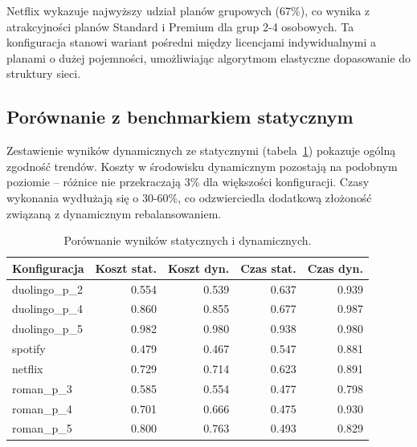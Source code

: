 Netflix wykazuje najwyższy udział planów grupowych (67\%), co wynika z atrakcyjności planów Standard i Premium dla grup 2-4 osobowych. Ta konfiguracja stanowi wariant pośredni między licencjami indywidualnymi a planami o dużej pojemności, umożliwiając algorytmom elastyczne dopasowanie do struktury sieci.

\subsection{Porównanie z benchmarkiem statycznym}

Zestawienie wyników dynamicznych ze statycznymi (tabela~\ref{tab:ext-static-dynamic-comparison}) pokazuje ogólną zgodność trendów. Koszty w środowisku dynamicznym pozostają na podobnym poziomie -- różnice nie przekraczają 3\% dla większości konfiguracji. Czasy wykonania wydłużają się o 30-60\%, co odzwierciedla dodatkową złożoność związaną z dynamicznym rebalansowaniem.

\begin{table}[H]
  \centering
  \caption{Porównanie wyników statycznych i dynamicznych.}
  \label{tab:ext-static-dynamic-comparison}
  \begin{tabular}{lrrrr}
    \toprule
    \textbf{Konfiguracja} & \textbf{Koszt stat.} & \textbf{Koszt dyn.} & \textbf{Czas stat.} & \textbf{Czas dyn.} \\
    \midrule
    duolingo\_p\_2        & 0.554                & 0.539               & 0.637               & 0.939              \\
    duolingo\_p\_4        & 0.860                & 0.855               & 0.677               & 0.987              \\
    duolingo\_p\_5        & 0.982                & 0.980               & 0.938               & 0.980              \\
    spotify               & 0.479                & 0.467               & 0.547               & 0.881              \\
    netflix               & 0.729                & 0.714               & 0.623               & 0.891              \\
    roman\_p\_3           & 0.585                & 0.554               & 0.477               & 0.798              \\
    roman\_p\_4           & 0.701                & 0.666               & 0.475               & 0.930              \\
    roman\_p\_5           & 0.800                & 0.763               & 0.493               & 0.829              \\
    \bottomrule
  \end{tabular}
\end{table}

